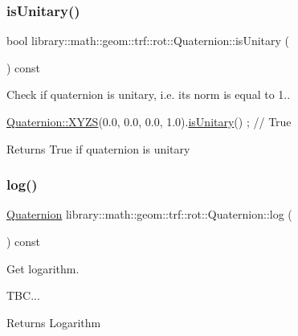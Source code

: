 \subsubsection{\texorpdfstring{is\+Unitary()}{isUnitary()}}
{\footnotesize\ttfamily bool library\+::math\+::geom\+::trf\+::rot\+::\+Quaternion\+::is\+Unitary (\begin{DoxyParamCaption}{ }\end{DoxyParamCaption}) const}



Check if quaternion is unitary, i.\+e. its norm is equal to 1.. 


\begin{DoxyCode}
\hyperlink{classlibrary_1_1math_1_1geom_1_1trf_1_1rot_1_1_quaternion_afff9523c7dcbfbbc521736121e62ad41}{Quaternion::XYZS}(0.0, 0.0, 0.0, 1.0).\hyperlink{classlibrary_1_1math_1_1geom_1_1trf_1_1rot_1_1_quaternion_aa5e8e0dc04aa0ac976106c823b61d911}{isUnitary}() ; \textcolor{comment}{// True}
\end{DoxyCode}


\begin{DoxyReturn}{Returns}
True if quaternion is unitary 
\end{DoxyReturn}
\mbox{\label{classlibrary_1_1math_1_1geom_1_1trf_1_1rot_1_1_quaternion_a9bcc04be5d0b9128860c9e494abbf5ee}} 
\subsubsection{\texorpdfstring{log()}{log()}}
{\footnotesize\ttfamily \hyperlink{classlibrary_1_1math_1_1geom_1_1trf_1_1rot_1_1_quaternion}{Quaternion} library\+::math\+::geom\+::trf\+::rot\+::\+Quaternion\+::log (\begin{DoxyParamCaption}{ }\end{DoxyParamCaption}) const}



Get logarithm. 


\begin{DoxyCode}
TBC...
\end{DoxyCode}


\begin{DoxyReturn}{Returns}
Logarithm 
\end{DoxyReturn}
\mbox{\label{classlibrary_1_1math_1_1geom_1_1trf_1_1rot_1_1_quaternion_a54cc89da4b3f36d7037b940c141e07ce}} 
